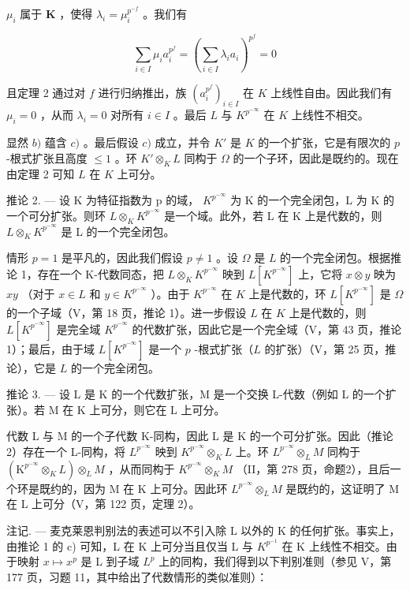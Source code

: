 \(\mu_{i}\) 属于 \(\mathbf{K}\) ，使得 \(\lambda_{i} = \mu_{i}^{p^{-f}}\) 。我们有

\[
\sum_ {i \in I} \mu_ {i} a _ {i} ^ {p ^ {f}} = \left(\sum_ {i \in I} \lambda_ {i} a _ {i}\right) ^ {p ^ {f}} = 0
\]

且定理 2 通过对 \(f\) 进行归纳推出，族 \((a_i^{p^f})_{i\in I}\) 在 \(K\) 上线性自由。因此我们有 \(\mu_i = 0\) ，从而 \(\lambda_i = 0\) 对所有 \(i\in I\) 。最后 \(L\) 与 \(K^{p^{-\infty}}\) 在 \(K\) 上线性不相交。

显然 \(b)\) 蕴含 \(c)\) 。最后假设 \(c)\) 成立，并令 \(K'\) 是 \(K\) 的一个扩张，它是有限次的 \(p\) -根式扩张且高度 \(\leqslant 1\) 。环 \(K' \otimes_K L\) 同构于 \(\Omega\) 的一个子环，因此是既约的。现在由定理 2 可知 \(L\) 在 \(K\) 上可分。

推论 2. --- 设 K 为特征指数为 p 的域， \(K^{p^{-\infty}}\) 为 K 的一个完全闭包，L 为 K 的一个可分扩张。则环 \(L \otimes_{K} K^{p^{-\infty}}\) 是一个域。此外，若 L 在 K 上是代数的，则 \(L \otimes_{K} K^{p^{-\infty}}\) 是 L 的一个完全闭包。

情形 \(p = 1\) 是平凡的，因此我们假设 \(p \neq 1\) 。设 \(\Omega\) 是 \(L\) 的一个完全闭包。根据推论 1，存在一个 K-代数同态，把 \(L \otimes_K K^{p^{-\infty}}\) 映到 \(L[K^{p^{-\infty}}]\) 上，它将 \(x \otimes y\) 映为 \(xy\) （对于 \(x \in L\) 和 \(y \in K^{p^{-\infty}}\) ）。由于 \(K^{p^{-\infty}}\) 在 \(K\) 上是代数的，环 \(L[K^{p^{-\infty}}]\) 是 \(\Omega\) 的一个子域（V，第 18 页，推论 1）。进一步假设 \(L\) 在 \(K\) 上是代数的，则 \(L[K^{p^{-\infty}}]\) 是完全域 \(K^{p^{-\infty}}\) 的代数扩张，因此它是一个完全域（V，第 43 页，推论 1）；最后，由于域 \(L[K^{p^{-\infty}}]\) 是一个 \(p\) -根式扩张（\(L\) 的扩张）（V，第 25 页，推论），它是 \(L\) 的一个完全闭包。

推论 3. --- 设 L 是 K 的一个代数扩张，M 是一个交换 L-代数（例如 L 的一个扩张）。若 M 在 K 上可分，则它在 L 上可分。

代数 L 与 M 的一个子代数 K-同构，因此 L 是 K 的一个可分扩张。因此（推论 2）存在一个 L-同构，将 \(L^{p^{-\infty}}\) 映到 \(K^{p^{-\infty}} \otimes_{K} L\) 上。环 \(L^{p^{-\infty}} \otimes_{L} M\) 同构于 \((\mathrm{K}^{p^{-\infty}} \otimes_{K} L) \otimes_{L} M\) ，从而同构于 \(K^{p^{-\infty}} \otimes_{K} M\) （II，第 278 页，命题2），且后一个环是既约的，因为 M 在 K 上可分。因此环 \(L^{p^{-\infty}} \otimes_{L} M\) 是既约的，这证明了 M 在 L 上可分（V，第 122 页，定理 2）。

注记. --- 麦克莱恩判别法的表述可以不引入除 L 以外的 K 的任何扩张。事实上，由推论 1 的 c) 可知，L 在 K 上可分当且仅当 L 与 \(K^{p^{-1}}\) 在 K 上线性不相交。由于映射 \(x \mapsto x^{p}\) 是 L 到子域 \(L^{p}\) 上的同构，我们得到以下判别准则（参见 V，第 177 页，习题 11，其中给出了代数情形的类似准则）：


